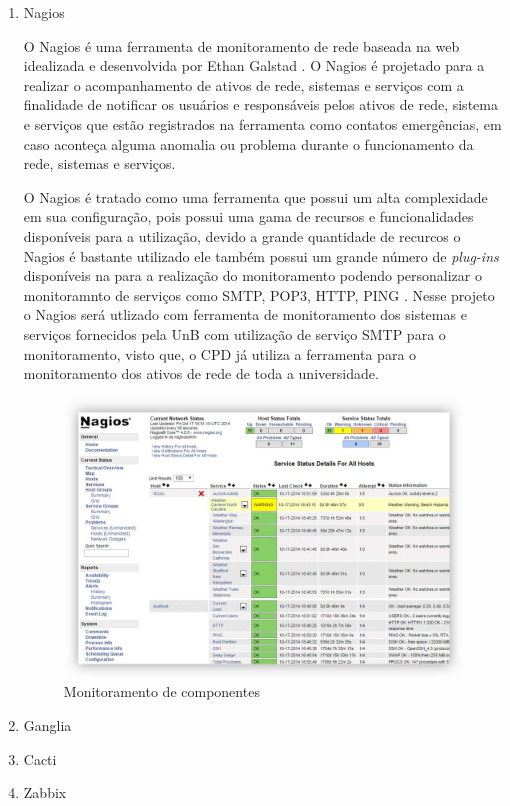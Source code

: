 \begin{enumerate}
\item Nagios

O Nagios é uma ferramenta de monitoramento de rede baseada na web idealizada e desenvolvida por Ethan Galstad \cite{bin2011new}. O Nagios é projetado para a realizar o acompanhamento de ativos de rede, sistemas e serviços com a finalidade de notificar os usuários e responsáveis pelos ativos de rede, sistema e serviços que estão registrados na ferramenta como contatos emergências, em caso aconteça alguma anomalia ou problema durante o funcionamento da rede, sistemas e serviços.

O Nagios é tratado como uma ferramenta que possui um alta complexidade em sua configuração, pois possui uma gama de recursos e funcionalidades disponíveis para a utilização, devido a grande quantidade de recurcos o Nagios é bastante utilizado ele também possui um grande número de \textit{plug-ins} disponíveis na para a realização do monitoramento podendo personalizar o monitoramnto de serviços como SMTP, POP3, HTTP, PING \cite{lcc2012nagios}. Nesse projeto o Nagios será utlizado com ferramenta de monitoramento dos sistemas e serviços fornecidos pela \acrshort{UnB} com utilização de serviço SMTP para o monitoramento, visto que, o \acrshort{CPD} já utiliza a ferramenta para o monitoramento dos ativos de rede de toda a universidade. 

\begin{figure}[h!]
	\begin{center}
	\includegraphics[scale = 0.40]{img/Comprehensive_Monitoring_Drop2.jpg}
		\caption{Monitoramento de componentes\cite{lcc2012nagios}}
		\label{fun:fig:nagios}
	\end{center}
\end{figure}

\item Ganglia
\item Cacti
\item Zabbix
\end{enumerate}

